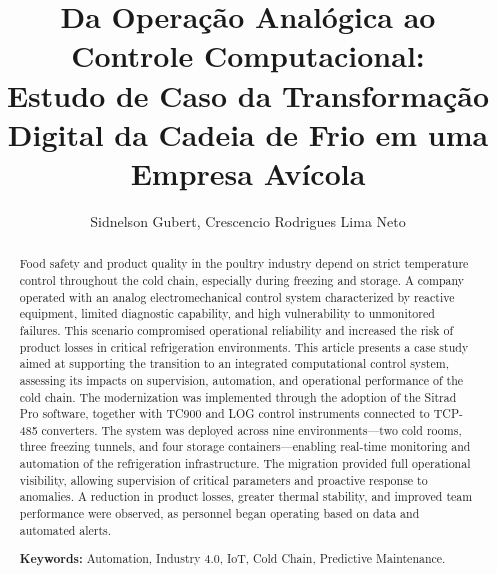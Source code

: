 \documentclass[12pt]{article}
\title{Da Operação Analógica ao Controle Computacional: \\Estudo de Caso da Transformação Digital da Cadeia de Frio em uma Empresa Avícola}
\author{Sidnelson Gubert\inst{1}, Crescencio Rodrigues Lima Neto  \inst{1}}
\begin{document}
\maketitle

\begin{abstract}

Food safety and product quality in the poultry industry depend on strict temperature control throughout the cold chain, especially during freezing and storage.  A company operated with an analog electromechanical control system characterized by reactive equipment, limited diagnostic capability, and high vulnerability to unmonitored failures. This scenario compromised operational reliability and increased the risk of product losses in critical refrigeration environments. This article presents a case study aimed at supporting the transition to an integrated computational control system, assessing its impacts on supervision, automation, and operational performance of the cold chain. The modernization was implemented through the adoption of the Sitrad Pro software, together with TC900 and LOG control instruments connected to TCP-485 converters. The system was deployed across nine environments—two cold rooms, three freezing tunnels, and four storage containers—enabling real-time monitoring and automation of the refrigeration infrastructure. The migration provided full operational visibility, allowing supervision of critical parameters and proactive response to anomalies. A reduction in product losses, greater thermal stability, and improved team performance were observed, as personnel began operating based on data and automated alerts.

\textbf{Keywords:} Automation, Industry 4.0, IoT, Cold Chain, Predictive Maintenance.

\end{abstract}
\end{document}
